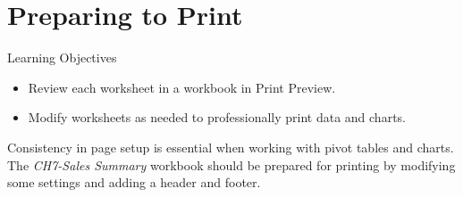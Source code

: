\section{Preparing to Print}

\begin{center}
	\begin{objbox}{Learning Objectives}
		\begin{itemize}
			\setlength{\itemsep}{0pt}
			\setlength{\parskip}{0pt}
			\setlength{\parsep}{0pt}
			
			\item Review each worksheet in a workbook in Print Preview.
			\item Modify worksheets as needed to professionally print data and charts.
			
		\end{itemize}
	\end{objbox}
\end{center}

Consistency in page setup is essential when working with pivot tables and charts. The \textit{CH7-Sales Summary} workbook should be prepared for printing by modifying some settings and adding a header and footer. 


